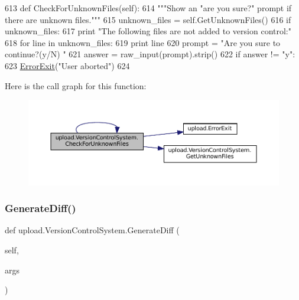 \begin{DoxyCode}
613   \textcolor{keyword}{def }CheckForUnknownFiles(self):
614     \textcolor{stringliteral}{"""Show an "are you sure?" prompt if there are unknown files."""}
615     unknown\_files = self.GetUnknownFiles()
616     \textcolor{keywordflow}{if} unknown\_files:
617       \textcolor{keywordflow}{print} \textcolor{stringliteral}{"The following files are not added to version control:"}
618       \textcolor{keywordflow}{for} line \textcolor{keywordflow}{in} unknown\_files:
619         \textcolor{keywordflow}{print} line
620       prompt = \textcolor{stringliteral}{"Are you sure to continue?(y/N) "}
621       answer = raw\_input(prompt).strip()
622       \textcolor{keywordflow}{if} answer != \textcolor{stringliteral}{"y"}:
623         \hyperlink{namespaceupload_adea53186a1d73e92cc839b7c35c2c044}{ErrorExit}(\textcolor{stringliteral}{"User aborted"})
624 
\end{DoxyCode}
Here is the call graph for this function\+:
\nopagebreak
\begin{figure}[H]
\begin{center}
\leavevmode
\includegraphics[width=350pt]{classupload_1_1VersionControlSystem_ad2923d691a1b1047e9359c5b7c1c103f_cgraph}
\end{center}
\end{figure}
\mbox{\label{classupload_1_1VersionControlSystem_aa5eb260c96e7016dab36b5fc136c9f49}} 
\subsubsection{\texorpdfstring{Generate\+Diff()}{GenerateDiff()}\hspace{0.1cm}{\footnotesize\ttfamily [1/2]}}
{\footnotesize\ttfamily def upload.\+Version\+Control\+System.\+Generate\+Diff (\begin{DoxyParamCaption}\item[{}]{self,  }\item[{}]{args }\end{DoxyParamCaption})}

